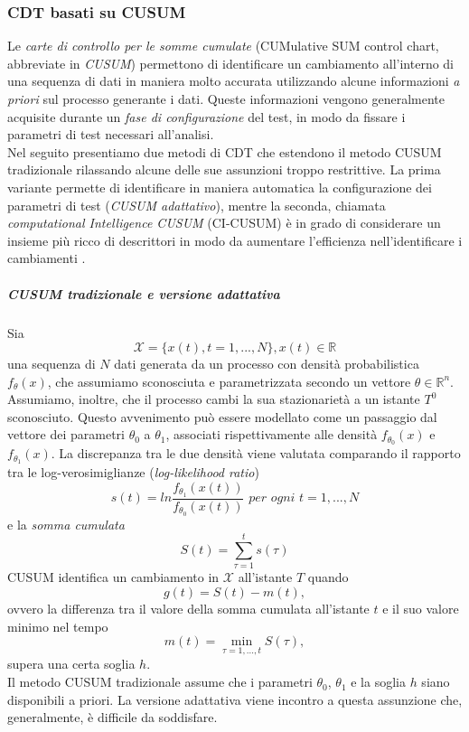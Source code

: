 \subsubsection{CDT basati su CUSUM}
Le \textit{carte di controllo per le somme cumulate} (CUMulative SUM control chart, abbreviate in \textit{CUSUM}) \cite{alippi2014intelligence,ross2009introduction} permettono di identificare un cambiamento all'interno di una sequenza di dati in maniera molto accurata utilizzando alcune informazioni \textit{a priori} sul processo generante i dati. Queste informazioni vengono generalmente acquisite durante un \textit{fase di configurazione} del test, in modo da fissare i parametri di test necessari all'analisi.\\
Nel seguito presentiamo due metodi di CDT che
estendono il metodo CUSUM tradizionale rilassando
alcune delle sue assunzioni troppo restrittive.  La
prima variante permette di identificare in maniera
automatica la configurazione dei parametri di test
(\textit{CUSUM adattativo}), mentre la seconda,
chiamata \textit{computational Intelligence CUSUM}
(CI-CUSUM) \`e in grado di considerare un insieme
pi\`u ricco di descrittori in modo da aumentare
l'efficienza nell'identificare i cambiamenti
\cite{alippi2008just}.  
\subparagraph{CUSUM tradizionale e versione adattativa}
Sia \[\mathcal{X}=\{x(t),t=1,...,N\},x(t)\in \mathbb{R}\]
una sequenza di $N$ dati generata da un processo con
densit\`a probabilistica $f_\theta(x)$, che assumiamo
sconosciuta e parametrizzata secondo un vettore
$\theta\in\mathbb{R}^n$. Assumiamo, inoltre, che il
processo cambi la sua stazionariet\`a a un istante
$T^0$ sconosciuto. Questo avvenimento pu\`o essere
modellato come un passaggio dal vettore dei parametri
$\theta_0$ a $\theta_1$, associati rispettivamente
alle densit\`a $f_{\theta_0}(x)$ e
$f_{\theta_1}(x)$. La discrepanza tra le due densit\`a
viene valutata comparando il rapporto tra le
log-verosimiglianze (\textit{log-likelihood ratio})
\[
s(t)=ln\frac{f_{\theta_1}(x(t))}{f_{\theta_0}(x(t))}
\textit{ per ogni } t=1,...,N \]
e la \textit{somma cumulata}
\[ S(t) = \sum^t_{\tau=1} s(\tau) \]
CUSUM identifica un cambiamento in $\mathcal{X}$ all'istante $\widehat{T}$ quando \[g(t)=S(t)-m(t),\] ovvero la differenza tra il valore della somma cumulata all'istante $t$ e il suo valore minimo nel tempo \[m(t)=\min_{\tau=1,...,t}S(\tau),\] supera una certa soglia $h$.\\
Il metodo CUSUM tradizionale assume che i parametri $\theta_0$, $\theta_1$ e la soglia $h$ siano disponibili a priori. La versione adattativa viene incontro a questa assunzione che, generalmente, \`e difficile da soddisfare.\\
